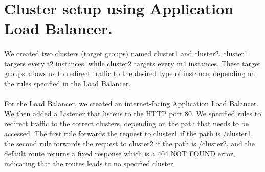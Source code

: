 \section{Cluster setup using Application Load Balancer.} \label{T2}

\paragraph{}We created two clusters (target groups) named cluster1 and cluster2. cluster1 targets every t2 instances, while cluster2 targets every m4 instances. These target groups allows us to redirect traffic to the desired type of instance, depending on the rules specified in the Load Balancer.
\paragraph{}For the Load Balancer, we created an internet-facing Application Load Balancer. We then added a Listener that listens to the HTTP port 80. We specified rules to redirect traffic to the correct clusters, depending on the path that needs to be accessed. The first rule forwards the request to cluster1 if the path is /cluster1, the second rule forwards the request to cluster2 if the path is /cluster2, and the default route returns a fixed response which is a 404 NOT FOUND error, indicating that the routes leads to no specified cluster.